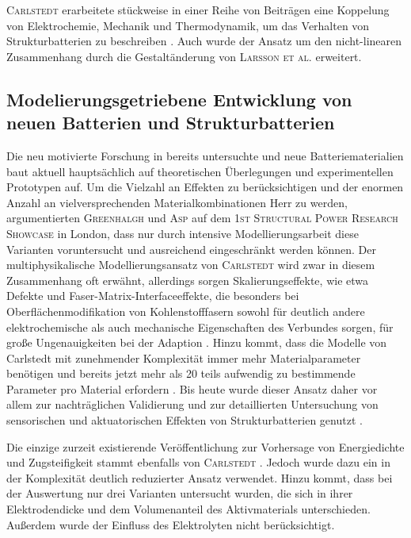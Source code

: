 \textsc{Carlstedt} erarbeitete stückweise in einer Reihe von Beiträgen eine Koppelung von Elektrochemie, Mechanik und Thermodynamik, um das Verhalten von Strukturbatterien zu beschreiben \cite{Carlstedt2019,Carlstedt2019a,Carlstedt2019b,Carlstedt2020,Carlstedt2020b,Carlstedt2022,Carlstedt2022a,Carlstedt2022b}. Auch wurde der Ansatz um den nicht-linearen Zusammenhang durch die Gestaltänderung von \textsc{Larsson et al.} \cite{Larsson2023} erweitert.

\subsection{Modelierungsgetriebene Entwicklung von neuen Batterien und Strukturbatterien}

Die neu motivierte Forschung in bereits untersuchte und neue Batteriematerialien baut aktuell hauptsächlich auf theoretischen Überlegungen und experimentellen Prototypen auf. Um die Vielzahl an Effekten zu berücksichtigen und der enormen Anzahl an vielversprechenden Materialkombinationen Herr zu werden, argumentierten \textsc{Greenhalgh} \cite{Greenhalgh2024,Greenhalgh2024a} und \textsc{Asp} \cite{Asp2024} auf dem \textsc{1st Structural Power Research Showcase} in London, dass nur durch intensive Modellierungsarbeit diese Varianten voruntersucht und ausreichend eingeschränkt werden können. Der multiphysikalische Modellierungsansatz von \textsc{Carlstedt} wird zwar in diesem Zusammenhang oft erwähnt, allerdings sorgen Skalierungseffekte, wie etwa Defekte und Faser-Matrix-Interfaceeffekte, die besonders bei Oberflächenmodifikation von Kohlenstofffasern sowohl für deutlich andere elektrochemische als auch mechanische Eigenschaften des Verbundes sorgen, für große Ungenauigkeiten bei der Adaption \cite{Franco2019,Fam2024}. Hinzu kommt, dass die Modelle von Carlstedt mit zunehmender Komplexität immer mehr Materialparameter benötigen und bereits jetzt mehr als 20 teils aufwendig zu bestimmende Parameter pro Material erfordern \cite{Greenhalgh2024a}. Bis heute wurde dieser Ansatz daher vor allem zur nachträglichen Validierung und zur detaillierten Untersuchung von sensorischen und aktuatorischen Effekten von Strukturbatterien genutzt \cite{Carlstedt2023}.

Die einzige zurzeit existierende Veröffentlichung zur Vorhersage von Energiedichte und Zugsteifigkeit stammt ebenfalls von \textsc{Carlstedt} \cite{Carlstedt2018}. Jedoch wurde dazu ein in der Komplexität deutlich reduzierter Ansatz verwendet. Hinzu kommt, dass bei der Auswertung nur drei Varianten untersucht wurden, die sich in ihrer Elektrodendicke und dem Volumenanteil des Aktivmaterials unterschieden. Außerdem wurde der Einfluss des Elektrolyten nicht berücksichtigt.



